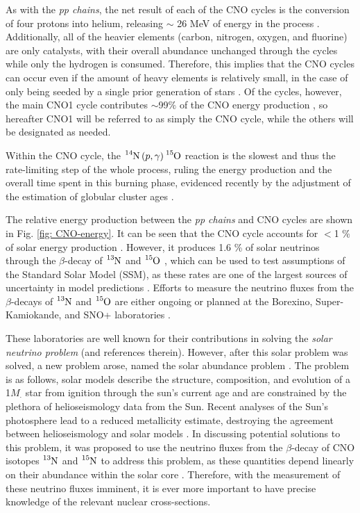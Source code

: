 \noindent As with the \textit{pp chains}, the net result of each of the CNO cycles is the conversion of four protons into helium, releasing $\sim$ 26 MeV of energy in the process \cite{RyanNortonBook}. Additionally, all of the heavier elements (carbon, nitrogen, oxygen, and fluorine) are only catalysts, with their overall abundance unchanged through the cycles while only the hydrogen is consumed. Therefore, this implies that the CNO cycles can occur even if the amount of heavy elements is relatively small, in the case of only being seeded by a single prior generation of stars \cite{IliadisBook}. Of the cycles, however, the main CNO1 cycle contributes $\sim$99$\%$ of the CNO energy production \cite{Adelberger1998}, so hereafter CNO1 will be referred to as simply the CNO cycle, while the others will be designated as needed. 

Within the CNO cycle, the $\ce{^{14}N} \left( p, \gamma \right) \ce{^{15}O}$ reaction is the slowest and thus the rate-limiting step of the whole process, ruling the energy production and the overall time spent in this burning phase, evidenced recently by the adjustment of the estimation of globular cluster ages \cite{Imbriani2004}.

The relative energy production between the \textit{pp chains} and CNO cycles are shown in Fig. \ref{fig: CNO-energy}. It can be seen that the CNO cycle accounts for $< $1 \% of solar energy production \cite{Adelberger1998, Adelberger2011}. However, it produces 1.6 \% of solar neutrinos through the $\beta$-decay of $\ce{^{13}N}$ and $\ce{^{15}O}$ \cite{Bahcall2005a}, which can be used to test assumptions of the Standard Solar Model (SSM), as these rates are one of the largest sources of uncertainty in model predictions \cite{Serenelli2013}. Efforts to measure the neutrino fluxes from the $\beta$-decays of $\ce{^{13}N}$ and $\ce{^{15}O}$ are either ongoing or planned at the Borexino, Super-Kamiokande, and SNO+ laboratories \cite{Jose2011a}.

These laboratories are well known for their contributions in solving the \textsl{solar neutrino problem} \cite{Jose2011a} (and references therein). However, after this solar problem was solved, a new problem arose, named the solar abundance problem \cite{Adelberger2011, Serenelli2009}. The problem is as follows, solar models describe the structure, composition, and evolution of a 1$M_{\cdot}$ star from ignition through the sun's current age and are constrained by the plethora of helioseismology data from the Sun. Recent analyses of the Sun's photosphere lead to a reduced metallicity estimate, destroying the agreement between helioseismology and solar models \cite{Asplund2009}. In discussing potential solutions to this problem, it was proposed to use the neutrino fluxes from the $\beta$-decay of CNO isotopes $\ce{^{13}N}$ and $\ce{^{15}N}$ to address this problem, as these quantities depend linearly on their abundance within the solar core \cite{Bahcall2005a, Bahcall2005b}. Therefore, with the measurement of these neutrino fluxes imminent, it is ever more important to have precise knowledge of the relevant nuclear cross-sections.  



